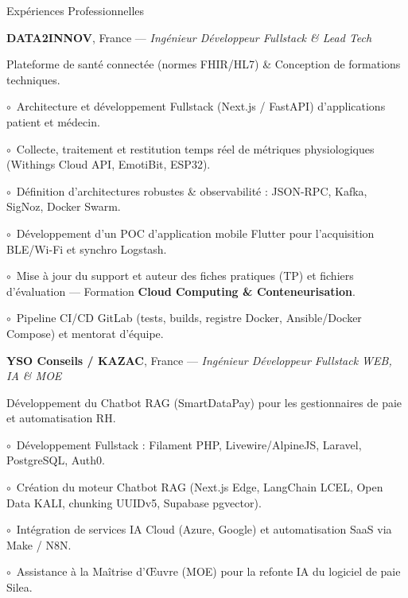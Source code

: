 \begin{rubric}{Expériences Professionnelles}

%
	\textbf{DATA2INNOV}, France --- \emph{Ingénieur Développeur Fullstack \& Lead Tech}\par
	Plateforme de santé connectée (normes FHIR/HL7) \& Conception de formations techniques.
	\par\hspace{1em}$\circ$~Architecture et développement Fullstack (Next.js / FastAPI) d'applications patient et médecin.
	\par\hspace{1em}$\circ$~Collecte, traitement et restitution temps réel de métriques physiologiques (Withings Cloud API, EmotiBit, ESP32).
	\par\hspace{1em}$\circ$~Définition d'architectures robustes \& observabilité : JSON-RPC, Kafka, SigNoz, Docker Swarm.
	\par\hspace{1em}$\circ$~Développement d'un POC d'application mobile Flutter pour l'acquisition BLE/Wi-Fi et synchro Logstash.
	\par\hspace{1em}$\circ$~Mise à jour du support et auteur des fiches pratiques (TP) et fichiers d'évaluation --- Formation \textbf{Cloud Computing \& Conteneurisation}.
	\par\hspace{1em}$\circ$~Pipeline CI/CD GitLab (tests, builds, registre Docker, Ansible/Docker Compose) et mentorat d'équipe.

%
	\textbf{YSO Conseils / KAZAC}, France --- \emph{Ingénieur Développeur Fullstack WEB, IA \& MOE}\par
	Développement du Chatbot RAG (SmartDataPay) pour les gestionnaires de paie et automatisation RH.
	\par\hspace{1em}$\circ$~Développement Fullstack : Filament PHP, Livewire/AlpineJS, Laravel, PostgreSQL, Auth0.
	\par\hspace{1em}$\circ$~Création du moteur Chatbot RAG (Next.js Edge, LangChain LCEL, Open Data KALI, chunking UUIDv5, Supabase pgvector).
	\par\hspace{1em}$\circ$~Intégration de services IA Cloud (Azure, Google) et automatisation SaaS via Make / N8N.
	\par\hspace{1em}$\circ$~Assistance à la Maîtrise d'Œuvre (MOE) pour la refonte IA du logiciel de paie Silea.


\end{rubric}

